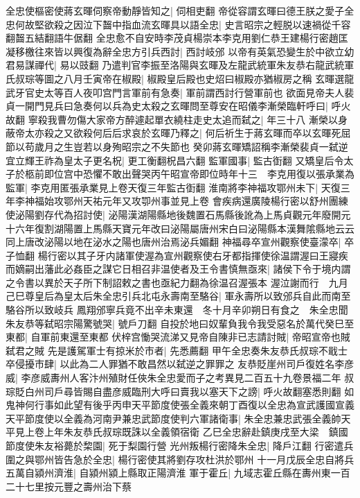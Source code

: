 全忠使樞密使蔣玄暉伺察帝動靜皆知之|{
	伺相吏翻}
帝從容謂玄暉曰德王朕之愛子全忠何故堅欲殺之因泣下齧中指血流玄暉具以語全忠|{
	史言昭宗之輕脱以速禍從千容翻齧五結翻語牛倨翻}
全忠愈不自安時李茂貞楊崇本李克用劉仁恭王建楊行密趙匡凝移檄往來皆以興復為辭全忠方引兵西討|{
	西討岐邠}
以帝有英氣恐變生於中欲立幼君易謀禪代|{
	易以豉翻}
乃遣判官李振至洛陽與玄暉及左龍武統軍朱友恭右龍武統軍氏叔琮等圖之八月壬寅帝在椒殿|{
	椒殿皇后殿也史炤曰椒殿亦猶椒房之稱}
玄暉選龍武牙官史太等百人夜叩宫門言軍前有急奏|{
	軍前謂西討行營軍前也}
欲面見帝夫人裴貞一開門見兵曰急奏何以兵為史太殺之玄暉問至尊安在昭儀李漸榮臨軒呼曰|{
	呼火故翻}
寧殺我曹勿傷大家帝方醉遽起單衣繞柱走史太追而弑之|{
	年三十八}
漸榮以身蔽帝太亦殺之又欲殺何后后求哀於玄暉乃釋之|{
	何后祈生于蔣玄暉而卒以玄暉死屈節以苟歲月之生豈若以身殉昭宗之不失節也}
癸卯蔣玄暉矯詔稱李漸榮裴貞一弑逆宜立輝王祚為皇太子更名柷|{
	更工衡翻柷昌六翻}
監軍國事|{
	監古衘翻}
又矯皇后令太子於柩前即位宫中恐懼不敢出聲哭丙午昭宣帝即位時年十三　李克用復以張承業為監軍|{
	李克用匿張承業見上卷天復三年監古衘翻}
淮南將李神福攻鄂州未下|{
	天復三年李神福始攻鄂州天祐元年又攻卾州事並見上卷}
會疾病還廣陵楊行密以舒州團練使泌陽劉存代為招討使|{
	泌陽漢湖陽縣地後魏置石馬縣後訛為上馬貞觀元年廢開元十六年復割湖陽置上馬縣天寶元年改曰泌陽屬唐州宋白曰泌陽縣本漢舞隂縣地云云同上唐改泌陽以地在泌水之陽也唐州治焉泌兵媚翻}
神福尋卒宣州觀察使臺濛卒|{
	卒子恤翻}
楊行密以其子牙内諸軍使渥為宣州觀察使右牙都指揮使徐温謂渥曰王寢疾而嫡嗣出藩此必姦臣之謀它日相召非温使者及王令書慎無亟來|{
	諸侯下令于境内謂之令書以異於天子所下制詔敕之書也亟紀力翻為徐温召渥張本}
渥泣謝而行　九月己巳尊皇后為皇太后朱全忠引兵北屯永壽南至駱谷|{
	軍永壽所以致邠兵自此而南至駱谷所以致岐兵}
鳳翔邠寧兵竟不出辛未東還　冬十月辛卯朔日有食之　朱全忠聞朱友恭等弑昭宗陽驚號哭|{
	號戶刀翻}
自投於地曰奴輩負我令我受惡名於萬代癸巳至東都|{
	自軍前東還至東都}
伏梓宫慟哭流涕又見帝自陳非已志請討賊|{
	帝昭宣帝也賊弑君之賊}
先是護駕軍士有掠米於市者|{
	先悉薦翻}
甲午全忠奏朱友恭氏叔琮不戢士卒侵擾市肆|{
	以此為二人罪猶不敢昌然以弑逆之罪罪之}
友恭貶崖州司戶復姓名李彦威|{
	李彦威夀州人客汴州殖財任俠朱全忠愛而子之考異見二百五十九卷景福二年}
叔琮貶白州司戶尋皆賜自盡彦威臨刑大呼曰賣我以塞天下之謗|{
	呼火故翻塞悉則翻}
如鬼神何行事如此望有後乎丙申天平節度使張全義來朝丁酉復以全忠為宣武護國宣義天平節度使以全義為河南尹兼忠武節度使判六軍諸衛事|{
	朱全忠兼忠武張全義帥天平見上卷上年朱友恭氏叔琮既誅以全義領宿衛}
乙巳全忠辭赴鎮庚戌至大梁　鎮國節度使朱友裕薨於棃園|{
	死于梨園行營}
光州叛楊行密降朱全忠|{
	降戶江翻}
行密遣兵圍之與鄂州皆告急於全忠|{
	楊行密使其將劉存攻杜洪於鄂州}
十一月戊辰全忠自將兵五萬自潁州濟淮|{
	自潁州潁上縣取正陽濟淮}
軍于霍丘|{
	九域志霍丘縣在夀州東一百二十七里按元豐之壽州治下蔡}
